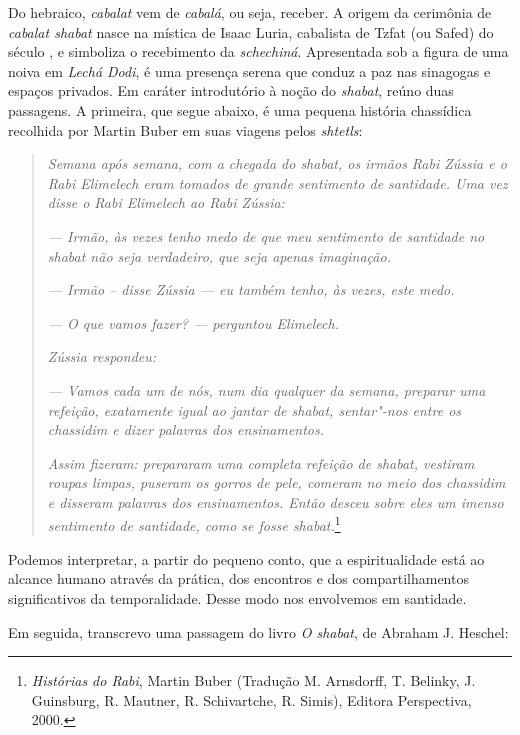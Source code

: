 
Do hebraico, \emph{cabalat} vem de \emph{cabalá}, ou seja, receber. A
origem da cerimônia de \emph{cabalat shabat} nasce na mística de Isaac Luria,
cabalista de Tzfat (ou Safed) do século , e simboliza o recebimento
da \emph{schechiná}. Apresentada sob a figura de uma noiva em \emph{Lechá Dodi}, é uma
presença serena que conduz a paz nas sinagogas e espaços privados.
Em caráter introdutório à noção do \emph{shabat}, reúno duas passagens. A
primeira, que segue abaixo, é uma pequena história chassídica recolhida
por Martin Buber em suas viagens pelos \emph{shtetls}:

\begin{quote}
\emph{Semana após semana, com a chegada do shabat, os irmãos Rabi Zússia
e o Rabi Elimelech eram tomados de grande sentimento de santidade. Uma
vez disse o Rabi Elimelech ao Rabi Zússia:}

\emph{--- Irmão, às vezes tenho medo de que meu sentimento de santidade
no shabat não seja verdadeiro, que seja apenas imaginação.}

\emph{--- Irmão -- disse Zússia --- eu também tenho, às vezes, este medo.}

\emph{--- O que vamos fazer? --- perguntou Elimelech.}

\emph{Zússia respondeu:}

\emph{--- Vamos cada um de nós, num dia qualquer da semana, preparar uma
refeição, exatamente igual ao jantar de shabat, sentar"-nos entre os
chassidim e dizer palavras dos ensinamentos.}

\emph{Assim fizeram: prepararam uma completa refeição de shabat,
vestiram roupas limpas, puseram os gorros de pele, comeram no meio dos
chassidim e disseram palavras dos ensinamentos. Então desceu sobre eles
um imenso sentimento de santidade, como se fosse shabat.}\footnote{\emph{Histórias do Rabi}, Martin Buber (Tradução M. Arnsdorff, T. Belinky, J. Guinsburg, R. Mautner, R. Schivartche, R. Simis), Editora Perspectiva, 2000.}
\end{quote}

Podemos interpretar, a partir do pequeno conto, que a espiritualidade
está ao alcance humano através da prática, dos encontros e dos
compartilhamentos significativos da temporalidade. Desse modo nos
envolvemos em santidade.

Em seguida, transcrevo uma passagem do livro \emph{O shabat}, de Abraham
J. Heschel:

